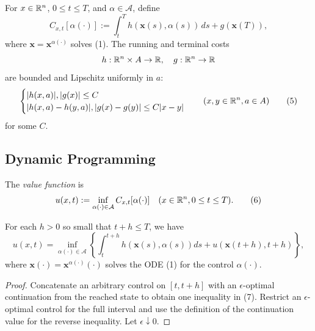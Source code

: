 \begin{definition}
\label{def:control-cost-functional}

For $x\in\mathbb{R}^n$, $0\leq t\leq T$, and $\alpha\in\mathcal A$, define
\[
C_{x,t}[\alpha(\cdot)] := \int_t^T h(\mathbf x(s), \alpha(s)) \, ds + g(\mathbf x(T)),
\tag{4}
\]
where $\mathbf x=\mathbf x^{\alpha(\cdot)}$ solves (1). The running and terminal costs
\[
h : \mathbb{R}^n \times A \to \mathbb{R}, \quad g : \mathbb{R}^n \to \mathbb{R}
\]
are bounded and Lipschitz uniformly in $a$:
\[
\begin{cases} |h(x, a)|, |g(x)| \le C \\ |h(x, a) - h(y, a)|, |g(x) - g(y)| \le C|x - y| \end{cases} \quad (x, y \in \mathbb{R}^n, a \in A)
\tag{5}
\]
for some $C$.
\end{definition}

\subsection{Dynamic Programming}

\begin{definition}
\label{def:value-function}

The \textit{value function} is
\[
u(x,t) := \inf_{\alpha(\cdot) \in \mathcal{A}} C_{x,t}[\alpha(\cdot)] \quad (x \in \mathbb{R}^n, 0 \le t \le T).
\tag{6}
\]
\end{definition}

\begin{theorem}
\label{thm:dynamic-programming-optimality-conditions}

For each $h > 0$ so small that $t + h \leq T$, we have
\[
u(x,t) = \inf_{\alpha(\cdot) \in \mathcal{A}} \left\{ \int_t^{t+h} h(\mathbf{x}(s), \alpha(s)) ds + u(\mathbf{x}(t+h), t+h) \right\},
\tag{7}
\]
where $\mathbf{x}(\cdot) = \mathbf{x}^{\alpha(\cdot)}(\cdot)$ solves the ODE (1) for the control $\alpha(\cdot)$.
\end{theorem}

\begin{proof}
\sketch Concatenate an arbitrary control on $[t,t+h]$ with an $\epsilon$-optimal continuation from the reached state to obtain one inequality in (7). Restrict an $\epsilon$-optimal control for the full interval and use the definition of the continuation value for the reverse inequality. Let $\epsilon\downarrow0$.
\end{proof}

